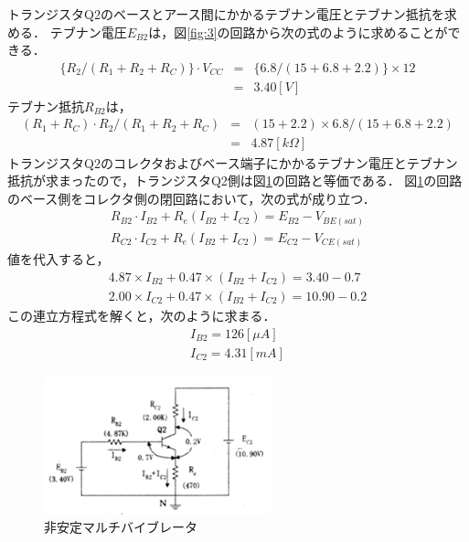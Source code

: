 \documentclass[10pt, a4j, dvipdfmx]{jarticle}
\begin{document}
    トランジスタQ2のベースとアース間にかかるテブナン電圧とテブナン抵抗を求める．
    テブナン電圧$E_{B2}$は，図\ref{fig:3}の回路から次の式のように求めることができる．
    \begin{eqnarray}
        \{R_2 / (R_1 + R_2 + R_C)\} \cdot V_{CC} & = & \{6.8 / (15 + 6.8 + 2.2)\} \times 12 \nonumber \\
        & = & 3.40 [V] \nonumber
    \end{eqnarray}
    テブナン抵抗$R_{B2}$は，
    \begin{eqnarray}
        (R_1 + R_C) \cdot R_2 / (R_1 + R_2 + R_C) & = & (15 + 2.2) \times 6.8 / (15 + 6.8 + 2.2) \nonumber \\
        & = & 4.87 [k\Omega] \nonumber
    \end{eqnarray}
    トランジスタQ2のコレクタおよびベース端子にかかるテブナン電圧とテブナン抵抗が求まったので，トランジスタQ2側は図\ref{fig:4}の回路と等価である．
    図\ref{fig:4}の回路のベース側をコレクタ側の閉回路において，次の式が成り立つ．
    \begin{eqnarray}
        R_{B2} \cdot I_{B2} + R_e (I_{B2} + I_{C2}) = E_{B2} - V_{BE(sat)} \nonumber \\
        R_{C2} \cdot I_{C2} + R_e (I_{B2} + I_{C2}) = E_{C2} - V_{CE(sat)} \nonumber
    \end{eqnarray}
    値を代入すると，
    \begin{eqnarray}
        4.87 \times I_{B2} + 0.47 \times (I_{B2} + I_{C2}) = 3.40 - 0.7 \nonumber \\
        2.00 \times I_{C2} + 0.47 \times (I_{B2} + I_{C2}) = 10.90 - 0.2 \nonumber
    \end{eqnarray}
    この連立方程式を解くと，次のように求まる．
    \begin{eqnarray}
        I_{B2} = 126 [\mu A] \nonumber \\
        I_{C2} = 4.31 [mA] \nonumber
    \end{eqnarray}
    \begin{figure}
        \vspace*{-\intextsep}
        \begin{center}
        \includegraphics[height=40mm]{images/fig-4.png}
        \caption{非安定マルチバイブレータ}
        \label{fig:4}
        \end{center}
    \end{figure}
\end{document}

